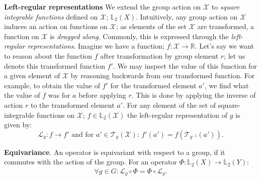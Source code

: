 \documentclass[nohyperref]{article}
\theoremstyle{plain}
\theoremstyle{definition}
\theoremstyle{remark}
\begin{document}
\textbf{Left-regular representations} We extend the group action on $\mathcal{X}$ to \textit{square integrable functions} defined on $\mathcal{X}$; $\mathbb{L}_2 (X)$. Intuitively, any group action on $\mathcal{X}$ induces an action on functions on $\mathcal{X}$; as elements of the set $\mathcal{X}$ are transformed, a function on $\mathcal{X}$ is \textit{dragged along}. Commonly, this is expressed through the \textit{left-regular representations}. Imagine we have a function; $f: \mathcal{X}\rightarrow \mathbb{R}$. Let's say we want to reason about the function $f$ after transformation by group element $r$; let us denote this transformed function $f'$. We may inspect the value of this function for a given element of $\mathcal{X}$ by reasoning backwards from our transformed function. For example, to obtain the value of $f'$ for the transformed element $a'$, we find what the value of $f$ was for $a$ before applying $r$. This is done by applying the inverse of action $r$ to the transformed element $a'$. For any element of the set of square-integrable functions on $\mathcal{X}$; $f\in \mathbb{L}_2 (\mathcal{X})$ the left-regular representation of $g$ is given by:
\begin{equation}
    \mathcal{L}_g: f \rightarrow f' \text{ and for $a' \in \mathcal{T}_g(\mathcal{X})$: } f'(a') = f(\mathcal{T}_{g^{-1}}(a')).
\end{equation}




\textbf{Equivariance}. An operator is equivariant with respect to a group, if it commutes with the action of the group. For an operator $\Phi:\mathbb{L}_2(X)\rightarrow\mathbb{L}_2(Y)$:
\begin{align}
    \forall g \in G: \mathcal{L}_{g} \circ \Phi = \Phi \circ \mathcal{L}_{g}.
\end{align}
\end{document}
